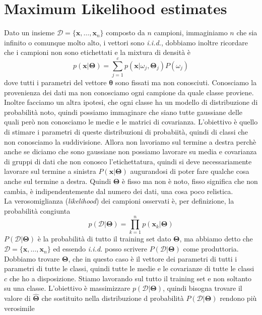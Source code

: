 \section{Maximum Likelihood estimates}
Dato un insieme $\mathcal{D}= \{\mathbf{x}, \dots, \mathbf{x}_n \}$ composto da $n$ campioni, immaginiamo $n$ che sia infinito o comunque molto alto, i vettori sono \emph{i.i.d.}, dobbiamo inoltre ricordare che i campioni non sono etichettati e la mixtura di densità è
\begin{equation}
p(\mathbf{x}|\mathbf{\Theta}) = \sum_{j=1}^c p(\mathbf{x}|\omega_j, \mathbf{\Theta}_j) P(\omega_j)
\end{equation}
dove tutti i parametri del vettore $\mathbf{\theta}$ sono fissati ma non conosciuti. Conosciamo la provenienza dei dati ma non conosciamo ogni campione da quale classe proviene. Inoltre facciamo un altra ipotesi, che ogni classe ha un modello di distribuzione di probabilità noto, quindi possiamo immaginare che siano tutte gaussiane delle quali però non conosciamo le medie e le matrici di covarianza. L'obiettivo è quello di stimare i parametri di queste distribuzioni di probabiità, quindi di classi che non conosciamo la suddivisione. Allora non lavoriamo sul termine a destra perchè anche se diciamo che sono gaussiane non possiamo lavorare su media e covarianza di gruppi di dati che non conosco l'etichettatura, quindi si deve necessariamente lavorare sul termine a sinistra $P(\mathbf{x}|\mathbf{\Theta})$ augurandosi di poter fare qualche cosa anche sul termine a destra. Quindi $\mathbf{\Theta}$ è fisso ma non è noto, fisso significa che non cambia, è indipendentemente dal numero dei dati, una cosa poco relistica.\\
La verosomiglianza (\emph{likelihood}) dei campioni osservati è, per definizione, la probabilità congiunta
\begin{equation}
p(\mathcal{D}|\mathbf{\Theta})  =\prod_{k=1}^n p(\mathbf{x}_k|\mathbf{\Theta})
\end{equation}
$P(\mathcal{D}|\mathbf{\Theta})$ è la probabilità di tutto il training set dato $\mathbf{\Theta}$, ma abbiamo detto che  $\mathcal{D}= \{\mathbf{x}, \dots, \mathbf{x}_n \}$ ed essendo \emph{i.i.d.} posso scrivere $P(\mathcal{D}|\mathbf{\Theta})$ come produttoria. Dobbiamo trovare $\mathbf{\Theta}$, che in questo caso è il vettore dei parametri di tutti i parametri di tutte le classi, quindi tutte le medie e le covarianze di tutte le classi $c$ che ho a disposizione. Stiamo lavorando sul tutto il training set e non soltanto su una classe. L'obiettivo è massimizzare $p(\mathcal{D}|\mathbf{\Theta})$, quindi bisogna trovare il valore di $\mathbf{\hat{\Theta}}$ che sostituito nella distribuzione d probabilità $P(\mathcal{D}|\mathbf{\Theta})$ rendono più verosimile  
